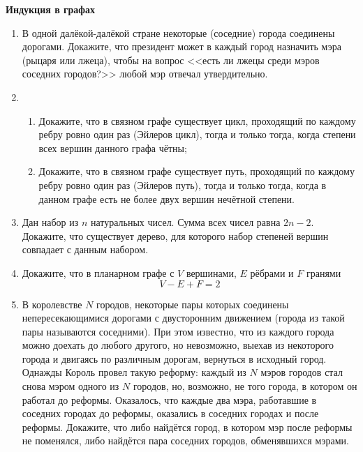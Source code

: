 \documentclass{article}
\begin{document}
\large
	
\begin{center}
	\textbf{Индукция в графах}
\end{center}


\begin{enumerate}[label*=\protect\fbox{\arabic{enumi}}]
	
\item В одной далёкой-далёкой стране некоторые (соседние) города соединены дорогами. Докажите, что президент может в каждый город назначить мэра (рыцаря или лжеца), чтобы на вопрос <<есть ли лжецы среди мэров соседних городов?>> любой мэр отвечал утвердительно.

\item 
\begin{enumerate}
	\item Докажите, что в связном графе существует цикл, проходящий по каждому ребру ровно один раз (Эйлеров
	цикл), тогда и только тогда, когда степени всех вершин данного графа чётны; 
	\item Докажите, что в связном графе
	существует путь, проходящий по каждому ребру ровно один раз (Эйлеров путь), тогда и только тогда, когда в
	данном графе есть не более двух вершин нечётной степени.
\end{enumerate}

\item Дан набор из $n$ натуральных чисел. Сумма всех чисел равна $2n-2$. Докажите, что существует
дерево, для которого набор степеней вершин совпадает с данным набором.

\item Докажите, что в планарном графе с $V$ вершинами, $E$ рёбрами и $F$ гранями $$V - E + F = 2$$

\item В королевстве $N$ городов, некоторые пары которых соединены непересекающимися дорогами с двусторонним движением (города из такой пары называются соседними). При этом известно, что из каждого города можно доехать до любого другого, но невозможно, выехав из некоторого города и двигаясь по различным дорогам, вернуться в исходный город.
Однажды Король провел такую реформу: каждый из $N$ мэров городов стал снова мэром одного из $N$ городов, но, возможно, не того города, в котором он работал до реформы. Оказалось, что каждые два мэра, работавшие в соседних городах до реформы, оказались в соседних городах и после реформы. Докажите, что либо найдётся город, в котором мэр после реформы не поменялся, либо найдётся пара соседних городов, обменявшихся мэрами.


\end{enumerate}
\end{document}
